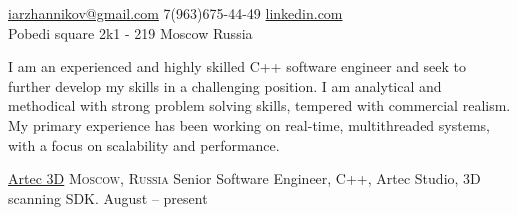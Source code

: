 \documentclass[10pt,a4paper]{article}
\begin{document}
\sloppy  %



\nobreakvspace{0.3em}  %

\noindent\href{mailto:iarzhannikov@gmail.com}{iarzhannikov\mbox{}@\mbox{}gmail.com}\sbull
\textsmaller{+}7(963)675-44-49\sbull
\href{https://www.linkedin.com/in/%D0%B0%D1%80%D0%B6%D0%B0%D0%BD%D0%BD%D0%B8%D0%BA%D0%BE%D0%B2-%D0%B8%D0%BB%D1%8C%D1%8F-8a125b37/en}{linkedin.com}
\\
Pobedi square 2k1 - 219\sbull
Moscow\sbull
Russia

\spacedhrule{0.9em}{-0.4em}  %


\vspace{-1.3em}  %
\begin{multicols}{2}  %
\noindent
I am an experienced and highly skilled C++ software engineer and seek to further develop my skills in a challenging position. I am analytical and methodical with strong problem solving skills, tempered with commercial realism. My primary experience has been working on real-time, multithreaded systems, with a focus on scalability and performance.
\end{multicols}


\spacedhrule{0em}{-0.4em}


\headedsection
  {\href{https://www.artec3d.com/}{Artec 3D}}
  {\textsc{Moscow, Russia}} {%
  \headedsubsection
    {Senior Software Engineer, C++, Artec Studio, 3D scanning SDK.}
    {August  -- present}
    {}
}
\end{document}
